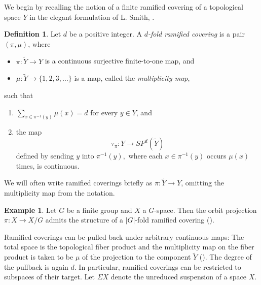 \documentclass{amsart}
\theoremstyle{definition}
\newtheorem{defn}[thm]{Definition}
\newtheorem{example}[thm]{Example}
\theoremstyle{remark}
\newcommand {\wY}    {{\ensuremath{\widetilde{Y}}}}
\begin{document}
We begin by recalling the notion of a finite ramified covering of
a topological space $Y$ in the elegant formulation of L. Smith, \cite{smithlarry}.
\begin{defn} \label{def.ramifiedcovering}
Let $d$ be a positive integer.
A \emph{$d$-fold ramified covering} is a pair
$(\pi, \mu)$, where
\begin{itemize}
\item $\pi: \widetilde{Y} \to Y$ is a continuous surjective finite-to-one map, and
\item $\mu: \widetilde{Y} \to \{ 1,2,3,\ldots \}$ is a map, called the
   \emph{multiplicity map}, 
\end{itemize}
such that
\begin{enumerate}
\item $\sum_{x \in \pi^{-1} (y)} \mu (x) = d$ for every $y \in Y$, and
\item the map
 \[  \tau_\pi: Y \longrightarrow SP^d (\widetilde{Y}) \]
  defined by sending $y$ into $\pi^{-1} (y),$
  where each $x \in \pi^{-1} (y)$ occurs $\mu (x)$ times, is continuous.
 \end{enumerate}
\end{defn}
We will often write ramified coverings briefly as $\pi: \wY \to Y$,
omitting the multiplicity map from the notation.

\begin{example} \label{exple.orbitprojisramifiedcov}
Let $G$ be a finite group and $X$ a $G$-space.
Then the orbit projection $\pi: X \to X/G$ admits
the structure of a $|G|$-fold ramified covering
(\cite[Prop. 1.5]{smithlarry}).
\end{example}

Ramified coverings can be pulled back under arbitrary continuous
maps: The total space is the topological fiber product and
the multiplicity map on the fiber product is taken to be $\mu$
of the projection to the component $\wY$
(\cite[p. 488, Prop. 1.3]{smithlarry}). The degree of the
pullback is again $d$. In particular,
ramified coverings can be restricted to subspaces of their target.
Let $\Sigma X$ denote the unreduced suspension of a space $X$.
\end{document}
